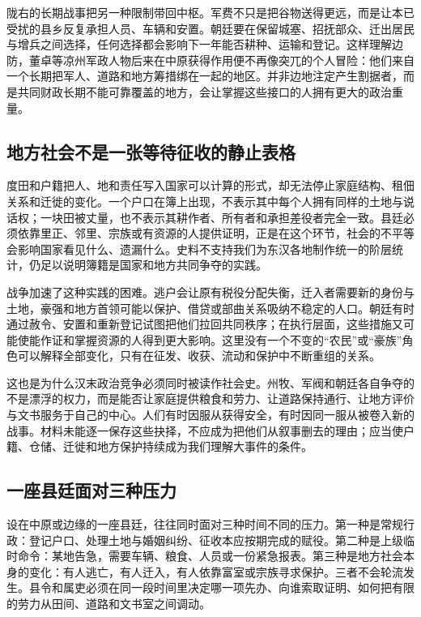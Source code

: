 陇右的长期战事把另一种限制带回中枢。军费不只是把谷物送得更远，而是让本已受扰的县乡反复承担人员、车辆和安置。朝廷要在保留城塞、招抚部众、迁出居民与增兵之间选择，任何选择都会影响下一年能否耕种、运输和登记。这样理解边防，董卓等凉州军政人物后来在中原获得作用便不再像突兀的个人冒险：他们来自一个长期把军人、道路和地方筹措绑在一起的地区。并非边地注定产生割据者，而是共同财政长期不能可靠覆盖的地方，会让掌握这些接口的人拥有更大的政治重量。

\subsection{地方社会不是一张等待征收的静止表格}

度田和户籍把人、地和责任写入国家可以计算的形式，却无法停止家庭结构、租佃关系和迁徙的变化。一个户口在簿上出现，不表示其中每个人拥有同样的土地与说话权；一块田被丈量，也不表示其耕作者、所有者和承担差役者完全一致。县廷必须依靠里正、邻里、宗族或有资源的人提供证明，正是在这个环节，社会的不平等会影响国家看见什么、遗漏什么。史料不支持我们为东汉各地制作统一的阶层统计，仍足以说明簿籍是国家和地方共同争夺的实践。

战争加速了这种实践的困难。逃户会让原有税役分配失衡，迁入者需要新的身份与土地，豪强和地方首领可能以保护、借贷或部曲关系吸纳不稳定的人口。朝廷有时通过赦令、安置和重新登记试图把他们拉回共同秩序；在执行层面，这些措施又可能使能作证和掌握资源的人得到更大影响。这里没有一个不变的“农民”或“豪族”角色可以解释全部变化，只有在征发、收获、流动和保护中不断重组的关系。

这也是为什么汉末政治竞争必须同时被读作社会史。州牧、军阀和朝廷各自争夺的不是漂浮的权力，而是能否让家庭提供粮食和劳力、让道路保持通行、让地方评价与文书服务于自己的中心。人们有时因服从获得安全，有时因同一服从被卷入新的战事。材料未能逐一保存这些抉择，不应成为把他们从叙事删去的理由；应当使户籍、仓储、迁徙和地方保护持续成为我们理解大事件的条件。

\subsection{一座县廷面对三种压力}

设在中原或边缘的一座县廷，往往同时面对三种时间不同的压力。第一种是常规行政：登记户口、处理土地与婚姻纠纷、征收本应按期完成的赋役。第二种是上级临时命令：某地告急，需要车辆、粮食、人员或一份紧急报表。第三种是地方社会本身的变化：有人逃亡，有人迁入，有人依靠富室或宗族寻求保护。三者不会轮流发生。县令和属吏必须在同一段时间里决定哪一项先办、向谁索取证明、如何把有限的劳力从田间、道路和文书室之间调动。


